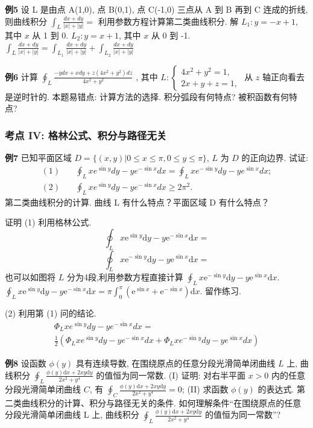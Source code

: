 \textbf{例5}
设 L 是由点 A(1,0), 点 B(0,1), 点 C(-1,0) 三点从 A 到 B 再到 C 连成的折线, 则曲线积分 \(\int_{L} \frac{dx+dy}{|x|+|y|} =\)
利用参数方程计算第二类曲线积分.
解 \(L_1: y = -x + 1\), 其中 \(x\) 从 1 到 0. \(L_2: y = x + 1\), 其中 \(x\) 从 0 到 -1. \(\int_{L} \frac{dx+dy}{|x|+|y|} = \int_{L_1} \frac{dx+dy}{|x|+|y|} + \int_{L_2} \frac{dx+dy}{|x|+|y|}\)

\textbf{例6}
计算 \(\oint_{L} \frac{- ydx + xdy + z(4x^{2} + y^{2})dz}{4x^{2} + y^{2}}\) , 其中 \(L: \left\{ \begin{array}{l}4x^{2} + y^{2} = 1, \\ 2x + y + z = 1, \end{array} \right.\) 从 \(z\) 轴正向看去是逆时针的.
本题易错点: 计算方法的选择.
积分弧段有何特点? 被积函数有何特点?


\subsubsection*{考点 IV: 格林公式、积分与路径无关}


\textbf{例7}
已知平面区域 \(D = \{(x, y) | 0 \le x \le \pi, 0 \le y \le \pi\}\), \(L\) 为 \(D\) 的正向边界. 试证:
\begin{align*}
(1) \quad & \oint_L xe^{\sin y} dy - ye^{-\sin x} dx = \oint_L xe^{-\sin y} dy - ye^{\sin x} dx; \\
(2) \quad & \oint_L xe^{\sin y} dy - ye^{-\sin x} dx \ge 2\pi^2.
\end{align*}
第二类曲线积分的计算.
曲线 L 有什么特点？平面区域 D 有什么特点？

证明 (1) 利用格林公式.
\[\oint_{L}x\mathrm{e}^{\sin y}\mathrm{d}y - y\mathrm{e}^{-\sin x}\mathrm{d}x =\] \[\oint_{L}x\mathrm{e}^{-\sin y}\mathrm{d}y - y\mathrm{e}^{\sin x}\mathrm{d}x =\]
也可以如图将 \(L\) 分为4段,利用参数方程直接计算 \(\oint_{L}x\mathrm{e}^{-\sin y}\mathrm{d}y - y\mathrm{e}^{\sin x}\mathrm{d}x.\) \(\oint_{L}x\mathrm{e}^{\sin y}\mathrm{d}y - y\mathrm{e}^{-\sin x}\mathrm{d}x = \pi \int_{0}^{\pi}(\mathrm{e}^{\sin x} + \mathrm{e}^{-\sin x})\mathrm{d}x.\) 留作练习.

(2) 利用第 (1) 问的结论.
\begin{align*}
\Phi_L x e^{\sin y} dy - y e^{-\sin x} dx = \\
\frac{1}{2} (\Phi_L x e^{\sin y} dy - y e^{-\sin x} dx + \Phi_L x e^{-\sin y} dy - y e^{\sin x} dx)
\end{align*}

\textbf{例8} 设函数 \(\phi (y)\) 具有连续导数, 在围绕原点的任意分段光滑简单闭曲线 \(L\) 上, 曲线积分 \(\oint_{L} \frac{\phi (y) \mathrm{d}x + 2xy \mathrm{d}y}{2x^{2} + y^{4}}\) 的值恒为同一常数. (I) 证明: 对右半平面 \(x > 0\) 内的任意分段光滑简单闭曲线 \(C\), 有 \(\oint_{C} \frac{\phi (y) \mathrm{d}x + 2xy \mathrm{d}y}{2x^{2} + y^{4}} = 0\); (II) 求函数 \(\phi (y)\) 的表达式.
第二类曲线积分的计算、积分与路径无关的条件.
如何理解条件“在围绕原点的任意分段光滑简单闭曲线 L 上, 曲线积分 \(\oint_{L} \frac{\phi (y) \mathrm{d}x + 2xy \mathrm{d}y}{2x^{2} + y^{4}}\) 的值恒为同一常数”?

